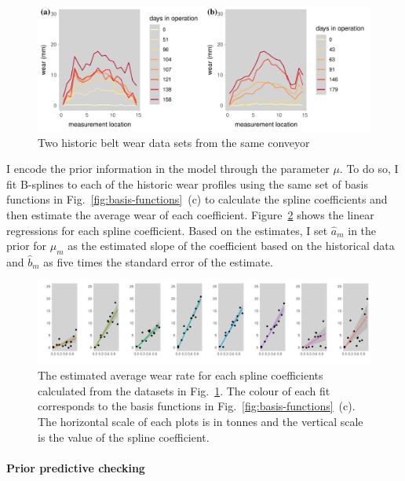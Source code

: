 \begin{figure}
  \centering
  \includegraphics[width=\textwidth]{figures/ch-6/historic_belts.pdf}
  \caption{Two historic belt wear data sets from the same conveyor}
  \label{fig:previouse-belts}
\end{figure}

I encode the prior information in the model through the parameter $\mu$. To do so, I fit B-splines to each of the historic wear profiles using the same set of basis functions in Fig.~\ref{fig:basis-functions}~(c) to calculate the spline coefficients and then estimate the average wear of each coefficient. Figure~\ref{fig:inf-prior-mu} shows the linear regressions for each spline coefficient. Based on the estimates, I set $\hat{a}_m$ in the prior for $\mu_m$ as the estimated slope of the coefficient based on the historical data and $\hat{b}_m$ as five times the standard error of the estimate.

\begin{figure}
  \centering
  \includegraphics[width=\textwidth]{figures/ch-6/informative-prior-mu.pdf}
  \caption{The estimated average wear rate for each spline coefficients calculated from the datasets in Fig.~\ref{fig:previouse-belts}. The colour of each fit corresponds to the basis functions in Fig.~\ref{fig:basis-functions}~(c). The horizontal scale of each plots is in tonnes and the vertical scale is the value of the spline coefficient.}
  \label{fig:inf-prior-mu}
\end{figure}

\paragraph*{Prior predictive checking} 

